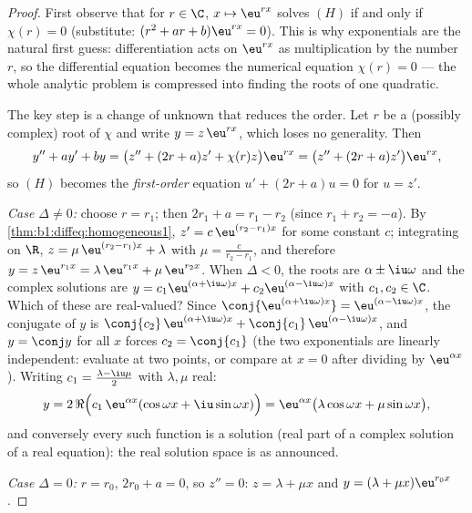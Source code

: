 \begin{proof}
First observe that for $r \in \C$, $x \mapsto \eu^{rx}$ solves $(H)$
if and only if $\chi(r) = 0$ (substitute: $(r^2 + ar + b)\eu^{rx} =
0$). This is why exponentials are the natural first guess:
differentiation acts on $\eu^{rx}$ as multiplication by the number
$r$, so the differential equation becomes the numerical equation
$\chi(r) = 0$ --- the whole analytic problem is compressed into
finding the roots of one quadratic.

The key step is a change of unknown that reduces the order. Let $r$ be
a (possibly complex) root of $\chi$ and write $y = z\, \eu^{rx}$,
which loses no generality. Then
\[
y'' + ay' + by
= \bigl(z'' + (2r + a) z' + \chi(r) z\bigr)\eu^{rx}
= \bigl(z'' + (2r + a) z'\bigr)\eu^{rx},
\]
so $(H)$ becomes the \emph{first-order} equation $u' + (2r + a) u = 0$
for $u = z'$.

\emph{Case $\Delta \neq 0$:} choose $r = r_1$; then $2r_1 + a = r_1 -
r_2$ (since $r_1 + r_2 = -a$). By
\cref{thm:b1:diffeq:homogeneous1}, $z' = c\,\eu^{(r_2 - r_1)x}$ for
some constant $c$; integrating on $\R$, $z = \mu\, \eu^{(r_2 - r_1)x}
+ \lambda$ with $\mu = \frac{c}{r_2 - r_1}$, and therefore $y = z\,
\eu^{r_1 x} = \lambda\,\eu^{r_1x} + \mu\,\eu^{r_2x}$.
When $\Delta < 0$, the roots are $\alpha \pm \iu\omega$ and the
complex solutions are $y = c_1\eu^{(\alpha+\iu\omega)x} +
c_2\eu^{(\alpha-\iu\omega)x}$ with $c_1, c_2 \in \C$. Which of
these are real-valued? Since $\conj{\eu^{(\alpha+\iu\omega)x}} =
\eu^{(\alpha-\iu\omega)x}$, the conjugate of $y$ is $\conj{c_2}\,
\eu^{(\alpha+\iu\omega)x} + \conj{c_1}\,\eu^{(\alpha-\iu\omega)x}$,
and $y = \conj y$ for all $x$ forces $c_2 = \conj{c_1}$ (the two
exponentials are linearly independent: evaluate at two points, or
compare at $x=0$ after dividing by $\eu^{\alpha x}$). Writing $c_1
= \frac{\lambda - \iu\mu}2$ with $\lambda, \mu$ real:
\[
y = 2\,\Re\Bigl(c_1\,\eu^{\alpha x}(\cos\omega x +
\iu\sin\omega x)\Bigr)
= \eu^{\alpha x}\bigl(\lambda\cos\omega x + \mu\sin\omega
x\bigr),
\]
and conversely every such function is a solution (real part of a
complex solution of a real equation): the real solution space is
as announced.

\emph{Case $\Delta = 0$:} $r = r_0$, $2r_0 + a = 0$, so $z'' = 0$:
$z = \lambda + \mu x$ and $y = (\lambda + \mu x)\eu^{r_0 x}$.
\end{proof}

